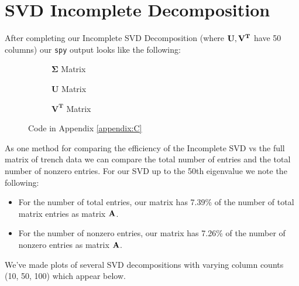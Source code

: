 \documentclass[letterpaper,12pt]{article}
\begin{document}
\section{SVD Incomplete Decomposition}
After completing our Incomplete SVD Decomposition (where \(\vb{U},\vb{V^T}\) have 50 columns) our \texttt{spy} output looks like the following:
\begin{figure}[H]
    \begin{adjustwidth}{-1in}{-1in}
    \centering
    \begin{subfigure}[b]{0.65\textwidth}
        \centering
        
        \caption{\(\mathbf{\Sigma}\) Matrix}
        \label{fig:4a}
    \end{subfigure}
    \hfill
    \begin{subfigure}[b]{0.65\textwidth}
        \centering
        
        \caption{\(\mathbf{U}\) Matrix}
        \label{fig:4b}
    \end{subfigure}
    \hfill
    \begin{subfigure}[b]{0.65\textwidth}
        \centering
        
        \caption{\(\mathbf{V^T}\) Matrix}
        \label{fig:4c}
    \end{subfigure}
    \end{adjustwidth}
    \caption{Code in Appendix \ref{appendix:C}}
    \label{fig:4}
\end{figure}
As one method for comparing the efficiency of the Incomplete SVD vs the full matrix of trench data we can compare the total number of entries and the total number of nonzero entries. 
For our SVD up to the 50th eigenvalue we note the following:
\begin{itemize}
    \item For the number of total entries, our matrix has 7.39\% of the number of total matrix entries as matrix \(\vb{A}\).
    \item For the number of nonzero entries, our matrix has 7.26\% of the number of nonzero entries as matrix \(\vb{A}\).
\end{itemize}
We've made plots of several SVD decompositions with varying column counts (10, 50, 100) which appear below.
\end{document}
